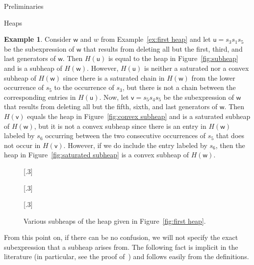 \documentclass[11pt]{amsart}
\theoremstyle{definition}
\newtheorem{example}[theorem]{Example}
\numberwithin{equation}{section}
\renewcommand{\u}{\mathsf{u}}
\renewcommand{\v}{\mathsf{v}}
\renewcommand{\(}{\left(}
\renewcommand{\)}{\right)}
\newcommand{\w}{\mathsf{w}}
\newcommand\xxaxis{0}
\newcommand\yyaxis{90}
\newcommand\heapblock[3]{\fill[draw=black, fill=gray!30, rounded corners, line width=1.1pt, shift={(\xxaxis:#1)},shift={(\yyaxis:#2)}] (-1,-0.5) rectangle (1,0.5);\node at (#1,#2) {\scriptsize $#3$};}
\begin{document}
\begin{section}{Preliminaries}
\begin{subsection}{Heaps}
\begin{example}\label{ex:third heap}
Consider $\w$ and $w$ from Example~\ref{ex:first heap} and let $\u=s_3 s_1 s_{5}$ be the subexpression of $\w$ that results from deleting all but the first, third, and last generators of $\w$.  Then $H(\u)$ is equal to the heap in Figure~\ref{fig:subheap} and is a subheap of $H(\w)$.  However, $H(\u)$ is neither a saturated nor a convex subheap of $H(\w)$ since there is a saturated chain in $H(\w)$ from the lower occurrence of $s_{5}$ to the occurrence of $s_{3}$, but there is not a chain between the corresponding entries in $H(\u)$.  Now, let $\v=s_{5}s_{4}s_{5}$ be the subexpression of $\w$ that results from deleting all but the fifth, sixth, and last generators of $\w$.  Then $H(\v)$ equals the heap in Figure~\ref{fig:convex subheap} and is a saturated subheap of $H(\w)$, but it is not a convex subheap since there is an entry in $H(\w)$ labeled by $s_{6}$ occurring between the two consecutive occurrences of $s_{5}$ that does not occur in $H(\v)$.  However, if we do include the entry labeled by $s_{6}$, then the heap in Figure~\ref{fig:saturated subheap}  is a convex subheap of $H(\w)$.  
\end{example}

\begin{figure}[!ht]
\subcaptionbox{\label{fig:subheap}}[.3\textwidth]{
}
\subcaptionbox{\label{fig:convex subheap}}[.3\textwidth]{
}
\subcaptionbox{\label{fig:saturated subheap}}[.3\textwidth]{
}
\caption{Various subheaps of the heap given in Figure~\ref{fig:first heap}.}
\label{fig:subheaps}
\end{figure}

From this point on, if there can be no confusion, we will not specify the exact subexpression that a subheap arises from.  The following fact is implicit in the literature (in particular, see the proof of~\cite[Proposition 3.3]{Stembridge1996}) and follows easily from the definitions.


\end{subsection}
\end{section}
\end{document}

